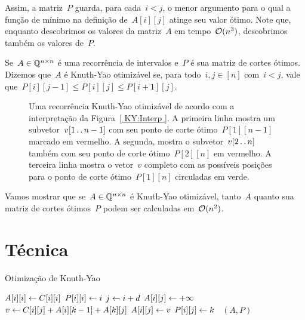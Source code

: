Assim, a matriz~$P$ guarda, para cada~$i < j$, o menor argumento para o qual a função de mínimo na definição de~$A[i][j]$ atinge seu valor ótimo. Note que, enquanto descobrimos os valores da matriz~$A$ em tempo~$\mathcal{O}(n^3)$, descobrimos também os valores de~$P$.

\begin{defi}
Se~$A \in \mathbb{Q}^{n \times n}$ é uma recorrência de intervalos e~$P$ é sua matriz de cortes ótimos. Dizemos que~$A$ é Knuth-Yao otimizável se, para todo~$i,j \in [n]$ com~$i < j$, vale que~${P[i][j-1] \leq P[i][j] \leq P[i+1][j]}$.
\end{defi}

\begin{figure}[h]
    \centering
    
    \caption{Uma recorrência Knuth-Yao otimizável de acordo com a interpretação da Figura~\ref{ KY:Interp }. A primeira linha mostra um subvetor~$v[1 \,.\,.\, n-1]$ com seu ponto de corte ótimo~$P[1][n-1]$ marcado em vermelho. A segunda, mostra o subvetor~$v[2 \,.\,.\, n]$ também com seu ponto de corte ótimo~$P[2][n]$ em vermelho. A terceira linha mostra o vetor~$v$ completo com as possíveis posições para o ponto de corte ótimo~$P[1][n]$ circuladas em verde.}
\end{figure}

Vamos mostrar que se~$A \in \mathbb{Q}^{n \times n}$ é Knuth-Yao otimizável, tanto~$A$ quanto sua matriz de cortes ótimos~$P$ podem ser calculadas em~$\mathcal{O}(n^2)$.


\section{Técnica}

\newcommand{\KY}{\textsc{KnuthYao}}
\begin{algorithm}[h]
\caption{Otimização de Knuth-Yao}
\label{KY:algo}
\begin{algorithmic}[1]
\Function{\KY}{C, n} 
        \State $A[i][i] \leftarrow C[i][i]$
        \State $P[i][i] \leftarrow i$
    \EndFor
            \State $j \leftarrow i+d$
            \State $A[i][j] \leftarrow +\infty$
             \label{KY:algo:loop}
                \State $v \leftarrow C[i][j] + A[i][k-1] + A[k][j]$
                    \State $A[i][j] \leftarrow v$
                    \State $P[i][j] \leftarrow k$
                \EndIf
            \EndFor
        \EndFor
    \EndFor
    \State \Return~$(A,P)$
\EndFunction
\end{algorithmic}
\end{algorithm}

